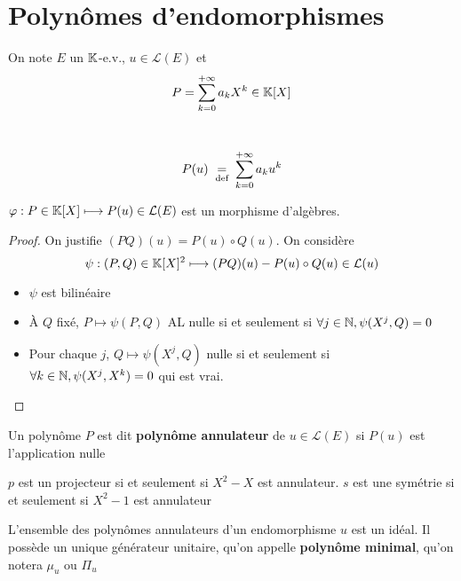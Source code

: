 \section{Polynômes d'endomorphismes}

\begin{defprop}
    \Hyp On note $E$ un $\mathbb K$-e.v., $u\in\mathcal L(E)$ et \[
        P=\sum_{k=0}^{+\infty}a_kX^k\in\mathbb K[X]
    \]
    \begin{concenum}
    \item ~ \[
            P(u)\;\underset{\text{def}}=\;\sum_{k=0}^{+\infty} a_ku^k
        \]
    \item $\varphi: P\in\mathbb K[X]\longmapsto P(u)\in\mathcal L(E)$ est un morphisme d'algèbres.
    \end{concenum}
\end{defprop}

\begin{proof}
    On justifie $(PQ)(u)=P(u)\circ Q(u)$. On considère \[
        \psi: (P, Q)\in\mathbb K[X]^2\longmapsto (PQ)(u)-P(u)\circ Q(u)\in\mathcal L(u)
    \]
    \begin{itemize}
        \item $\psi$ est bilinéaire
        \item À $Q$ fixé, $P\longmapsto \psi(P, Q)$ AL nulle si et seulement si $\forall j\in\mathbb N, \psi(X^j, Q)=0$
        \item Pour chaque $j$, $Q\longmapsto \psi(X^j, Q)$ nulle si et seulement si $\forall k\in\mathbb N, \psi(X^j, X^k)=0$ qui est vrai.
    \end{itemize}
\end{proof}

\begin{dfn}
    Un polynôme $P$ est dit \textbf{polynôme annulateur} de $u\in\mathcal L(E)$ si $P(u)$ est l'application nulle
\end{dfn}

\begin{ex}
    $p$ est un projecteur si et seulement si $X^2-X$ est annulateur. $s$ est une symétrie si et seulement si $X^2-1$ est annulateur
\end{ex}

\begin{defprop}
    L'ensemble des polynômes annulateurs d'un endomorphisme $u$ est un idéal. Il possède un unique générateur unitaire, qu'on appelle \textbf{polynôme minimal}, qu'on notera $\mu_u$ ou $\Pi_u$
\end{defprop}

